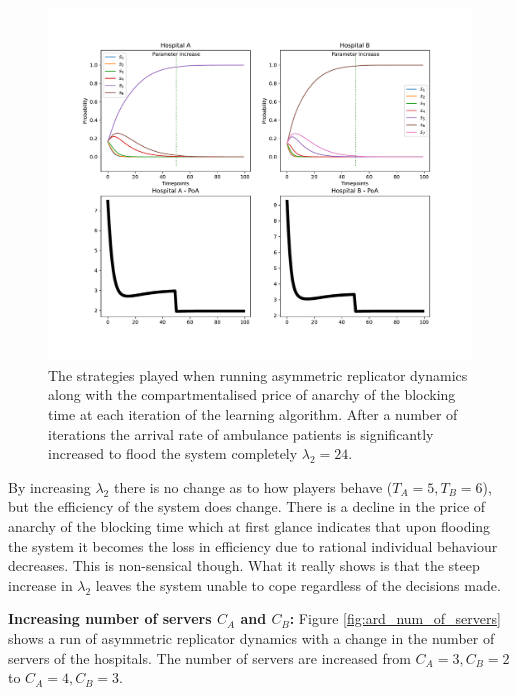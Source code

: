 \begin{figure}[H]
    \includegraphics[width=\textwidth]{imgs/asymmetric_rd_and_PoA/asymmetric_flooding.pdf}
    \caption{The strategies played when running asymmetric replicator dynamics
    along with the compartmentalised price of anarchy of the blocking time at
    each iteration of the learning algorithm. After a number of iterations the 
    arrival rate of ambulance patients is significantly increased to flood the
    system completely \( \lambda_2 = 24 \).}
    \label{fig:ard_lambda_2}
\end{figure}


By increasing \(\lambda_2\) there is no change as to how players behave
(\(T_A = 5, T_B = 6\)), but the efficiency of the system does change. 
There is a decline in the price of anarchy of the blocking time which at first 
glance indicates that upon flooding the system it becomes the loss in efficiency
due to rational individual behaviour decreases. 
This is non-sensical though.
What it really shows is that the steep increase in \( \lambda_2 \) leaves 
the system unable to cope regardless of the decisions made.

\textbf{Increasing number of servers \( C_A \) and \( C_B \):}
Figure \ref{fig:ard_num_of_servers} shows a run of asymmetric replicator 
dynamics with a change in the number of servers of the hospitals.
The number of servers are increased from \(C_A = 3, C_B = 2\) to 
\(C_A = 4, C_B = 3\).


